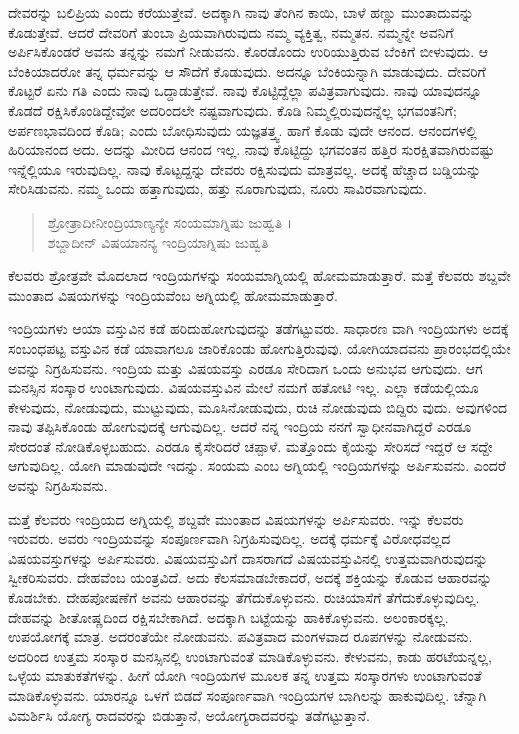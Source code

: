 ದೇವರನ್ನು ಬಲಿಪ್ರಿಯ ಎಂದು ಕರೆಯುತ್ತೇವೆ. ಅದಕ್ಕಾಗಿ ನಾವು ತೆಂಗಿನ ಕಾಯಿ, ಬಾಳೆ ಹಣ್ಣು ಮುಂತಾದುವನ್ನು ಕೊಡುತ್ತೇವೆ. ಆದರೆ ದೇವರಿಗೆ ತುಂಬಾ ಪ್ರಿಯವಾಗಿರುವುದು ನಮ್ಮ ವ್ಯಕ್ತಿತ್ವ, ನಮ್ಮತನ. ನಮ್ಮನ್ನೇ ಅವನಿಗೆ ಅರ್ಪಿಸಿಕೊಂಡರೆ ಅವನು ತನ್ನನ್ನು ನಮಗೆ ನೀಡುವನು. ಕೊರಡೊಂದು ಉರಿಯುತ್ತಿರುವ ಬೆಂಕಿಗೆ ಬೀಳುವುದು. ಆ ಬೆಂಕಿಯಾದರೋ ತನ್ನ ಧರ್ಮವನ್ನು ಆ ಸೌದೆಗೆ ಕೊಡುವುದು. ಅದನ್ನೂ ಬೆಂಕಿಯನ್ನಾಗಿ ಮಾಡುವುದು. ದೇವರಿಗೆ ಕೊಟ್ಟರೆ ಏನು ಗತಿ ಎಂದು ನಾವು ಒದ್ದಾಡುತ್ತೇವೆ. ನಾವು ಕೊಟ್ಟಿದ್ದೆಲ್ಲಾ ಪವಿತ್ರವಾಗುವುದು. ನಾವು ಯಾವುದನ್ನೂ ಕೊಡದೆ ರಕ್ಷಿಸಿಕೊಂಡಿದ್ದೇವೋ ಅದರಿಂದಲೇ ನಷ್ಟವಾಗುವುದು. ಕೊಡಿ ನಿಮ್ಮಲ್ಲಿರುವುದನ್ನೆಲ್ಲ ಭಗವಂತನಿಗೆ; ಅರ್ಪಣಭಾವದಿಂದ ಕೊಡಿ; ಎಂದು ಬೋಧಿಸುವುದು ಯಜ್ಞತತ್ತ್ವ. ಹಾಗೆ ಕೊಡು ವುದೇ ಆನಂದ. ಆನಂದಗಳಲ್ಲಿ ಹಿರಿಯಾನಂದ ಅದು. ಅದನ್ನು ಮೀರಿದ ಆನಂದ ಇಲ್ಲ. ನಾವು ಕೊಟ್ಟಿದ್ದು ಭಗವಂತನ ಹತ್ತಿರ ಸುರಕ್ಷಿತವಾಗಿರುವಷ್ಟು ಇನ್ನೆಲ್ಲಿಯೂ ಇರುವುದಿಲ್ಲ. ನಾವು ಕೊಟ್ಟದ್ದನ್ನು ದೇವರು ರಕ್ಷಿಸುವುದು ಮಾತ್ರವಲ್ಲ. ಅದಕ್ಕೆ ಹೆಚ್ಚಾದ ಬಡ್ಡಿಯನ್ನು ಸೇರಿಸಿಡುವನು. ನಮ್ಮ ಒಂದು ಹತ್ತಾಗುವುದು, ಹತ್ತು ನೂರಾಗುವುದು, ನೂರು ಸಾವಿರವಾಗುವುದು.

\begin{verse}
ಶ್ರೋತ್ರಾದೀನೀಂದ್ರಿಯಾಣ್ಯನ್ಯೇ ಸಂಯಮಾಗ್ನಿಷು ಜುಹ್ವತಿ ।\\ಶಬ್ದಾದೀನ್ ವಿಷಯಾನನ್ಯ ಇಂದ್ರಿಯಾಗ್ನಿಷು ಜುಹ್ವತಿ 
\end{verse}

{\small ಕೆಲವರು ಶ್ರೋತ್ರವೇ ಮೊದಲಾದ ಇಂದ್ರಿಯಗಳನ್ನು ಸಂಯಮಾಗ್ನಿಯಲ್ಲಿ ಹೋಮಮಾಡುತ್ತಾರೆ. ಮತ್ತೆ ಕೆಲವರು ಶಬ್ದವೇ ಮುಂತಾದ ವಿಷಯಗಳನ್ನು ಇಂದ್ರಿಯವೆಂಬ ಅಗ್ನಿಯಲ್ಲಿ ಹೋಮಮಾಡುತ್ತಾರೆ.}

ಇಂದ್ರಿಯಗಳು ಆಯಾ ವಸ್ತುವಿನ ಕಡೆ ಹರಿದುಹೋಗುವುದನ್ನು ತಡೆಗಟ್ಟುವರು. ಸಾಧಾರಣ ವಾಗಿ ಇಂದ್ರಿಯಗಳು ಅದಕ್ಕೆ ಸಂಬಂಧಪಟ್ಟ ವಸ್ತುವಿನ ಕಡೆ ಯಾವಾಗಲೂ ಜಾರಿಕೊಂಡು ಹೋಗುತ್ತಿರುವುವು. ಯೋಗಿಯಾದವನು ಪ್ರಾರಂಭದಲ್ಲಿಯೇ ಅವನ್ನು ನಿಗ್ರಹಿಸುವನು. ಇಂದ್ರಿಯ ಮತ್ತು ವಿಷಯವಸ್ತು ಎರಡೂ ಸೇರಿದಾಗ ಒಂದು ಅನುಭವ ಆಗುವುದು. ಆಗ ಮನಸ್ಸಿನ ಸಂಸ್ಕಾರ ಉಂಟಾಗುವುದು. ವಿಷಯವಸ್ತುವಿನ ಮೇಲೆ ನಮಗೆ ಹತೋಟಿ ಇಲ್ಲ. ಎಲ್ಲಾ ಕಡೆಯಲ್ಲಿಯೂ ಕೇಳುವುದು, ನೋಡುವುದು, ಮುಟ್ಟುವುದು, ಮೂಸಿನೋಡುವುದು, ರುಚಿ ನೋಡುವುದು ಬಿದ್ದಿರು ವುದು. ಅವುಗಳಿಂದ ನಾವು ತಪ್ಪಿಸಿಕೊಂಡು ಹೋಗುವುದಕ್ಕೆ ಆಗುವುದಿಲ್ಲ. ಆದರೆ ನನ್ನ ಇಂದ್ರಿಯ ನನಗೆ ಸ್ವಾಧೀನವಾಗಿದ್ದರೆ ಎರಡೂ ಸೇರದಂತೆ ನೋಡಿಕೊಳ್ಳಬಹುದು. ಎರಡೂ ಕೈಸೇರಿದರೆ ಚಪ್ಪಾಳೆ. ಮತ್ತೊಂದು ಕೈಯನ್ನು ಸೇರಿಸದೆ ಇದ್ದರೆ ಆ ಸದ್ದೇ ಆಗುವುದಿಲ್ಲ. ಯೋಗಿ ಮಾಡುವುದೇ ಇದನ್ನು. ಸಂಯಮ ಎಂಬ ಅಗ್ನಿಯಲ್ಲಿ ಇಂದ್ರಿಯಗಳನ್ನು ಅರ್ಪಿಸುವನು. ಎಂದರೆ ಅವನ್ನು ನಿಗ್ರಹಿಸುವನು.

ಮತ್ತೆ ಕೆಲವರು ಇಂದ್ರಿಯದ ಅಗ್ನಿಯಲ್ಲಿ ಶಬ್ದವೇ ಮುಂತಾದ ವಿಷಯಗಳನ್ನು ಅರ್ಪಿಸುವರು. ಇನ್ನು ಕೆಲವರು ಇರುವರು. ಅವರು ಇಂದ್ರಿಯವನ್ನು ಸಂಪೂರ್ಣವಾಗಿ ನಿಗ್ರಹಿಸುವುದಿಲ್ಲ. ಅದಕ್ಕೆ ಧರ್ಮಕ್ಕೆ ವಿರೋಧವಲ್ಲದ ವಿಷಯವಸ್ತುಗಳನ್ನು ಅರ್ಪಿಸುವರು. ವಿಷಯವಸ್ತುವಿಗೆ ದಾಸರಾಗದೆ ವಿಷಯವಸ್ತುವಿನಲ್ಲಿ ಉತ್ತಮವಾಗಿರುವುದನ್ನು ಸ್ವೀಕರಿಸುವರು. ದೇಹವೆಂಬ ಯಂತ್ರವಿದೆ. ಅದು ಕೆಲಸಮಾಡಬೇಕಾದರೆ, ಅದಕ್ಕೆ ಶಕ್ತಿಯನ್ನು ಕೊಡುವ ಆಹಾರವನ್ನು ಕೊಡಬೇಕು. ದೇಹಪೋಷಣೆಗೆ ಅವನು ಆಹಾರವನ್ನು ತೆಗೆದುಕೊಳ್ಳುವನು. ರುಚಿಯಾಸೆಗೆ ತೆಗೆದುಕೊಳ್ಳುವುದಿಲ್ಲ. ದೇಹವನ್ನು ಶೀತೋಷ್ಣದಿಂದ ರಕ್ಷಿಸಬೇಕಾಗಿದೆ. ಅದಕ್ಕಾಗಿ ಬಟ್ಟೆಯನ್ನು ಹಾಕಿಕೊಳ್ಳುವನು. ಅಲಂಕಾರಕ್ಕಲ್ಲ. ಉಪಯೋಗಕ್ಕೆ ಮಾತ್ರ. ಅದರಂತೆಯೇ ನೋಡುವನು. ಪವಿತ್ರವಾದ ಮಂಗಳವಾದ ರೂಪಗಳನ್ನು ನೋಡುವನು. ಅದರಿಂದ ಉತ್ತಮ ಸಂಸ್ಕಾರ ಮನಸ್ಸಿನಲ್ಲಿ ಉಂಟಾಗುವಂತೆ ಮಾಡಿಕೊಳ್ಳುವನು. ಕೇಳುವನು, ಕಾಡು ಹರಟೆಯನ್ನಲ್ಲ, ಒಳ್ಳೆಯ ಮಾತುಕತೆಗಳನ್ನು. ಹೀಗೆ ಯೋಗಿ ಇಂದ್ರಿಯಗಳ ಮೂಲಕ ತನ್ನ ಉತ್ತಮ ಸಂಸ್ಕಾರಗಳು ಉಂಟಾಗುವಂತೆ ಮಾಡಿಕೊಳ್ಳುವನು. ಯಾರನ್ನೂ ಒಳಗೆ ಬಿಡದೆ ಸಂಪೂರ್ಣವಾಗಿ ಇಂದ್ರಿಯಗಳ ಬಾಗಿಲನ್ನು ಹಾಕುವುದಿಲ್ಲ. ಚೆನ್ನಾಗಿ ವಿಮರ್ಶಿಸಿ ಯೋಗ್ಯ ರಾದವರನ್ನು ಬಿಡುತ್ತಾನೆ, ಅಯೋಗ್ಯರಾದವರನ್ನು ತಡೆಗಟ್ಟುತ್ತಾನೆ.

